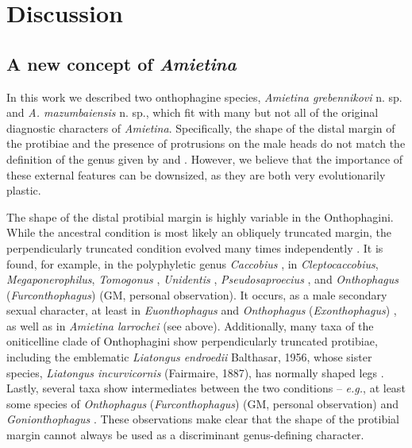\documentclass[fleqn,10pt,lineno]{wlpeerj}
\begin{document}
\section*{Discussion}

\subsection*{A new concept of \textit{Amietina}}
In this work we described two onthophagine species, \textit{Amietina grebennikovi} n. sp. and \textit{A. mazumbaiensis} n. sp., which fit with many but not all of the original diagnostic characters of \textit{Amietina}. Specifically, the shape of the distal margin of the protibiae and the presence of protrusions on the male heads do not match the definition of the genus given by \cite{cambefort1981amietina} and \cite{branco1988deux}. However, we believe that the importance of these external features can be downsized, as they are both very evolutionarily plastic.

The shape of the distal protibial margin is highly variable in the Onthophagini. While the ancestral condition is most likely an obliquely truncated margin, the perpendicularly truncated condition evolved many times independently \citep{ayivi2021mitochondrial, breeschoten2016phylogenetics, tarasov2011phylogenetic, philips2016phylogeny}. It is found, for example, in the polyphyletic genus \textit{Caccobius} \citep{tarasov2011phylogenetic, genier2017digitonthophagus}, in \textit{Cleptocaccobius}, \textit{Megaponerophilus}, \textit{Tomogonus} \citep{davis2008african}, \textit{Unidentis} \citep{josso2008unidentis}, \textit{Pseudosaproecius} \citep{branco1995essai}, and \textit{Onthophagus} (\textit{Furconthophagus}) (GM, personal observation). It occurs, as a male secondary sexual character, at least in \textit{Euonthophagus} and \textit{Onthophagus} (\textit{Exonthophagus}) \citep{kabakov2006scarab}, as well as in \textit{Amietina larrochei} (see above). Additionally, many taxa of the oniticelline clade of Onthophagini \citep{breeschoten2016phylogenetics} show perpendicularly truncated protibiae, including the emblematic \textit{Liatongus endroedii} Balthasar, 1956, whose sister species, \textit{Liatongus incurvicornis} (Fairmaire, 1887), has normally shaped legs \citep{balthasar1956einige}. Lastly, several taxa show intermediates between the two conditions -- \textit{e.g.}, at least some species of \textit{Onthophagus} (\textit{Furconthophagus}) (GM, personal observation) and \textit{Gonionthophagus} \citep{dierkens2023gonionthophagus}. These observations make clear that the shape of the protibial margin cannot always be used as a discriminant genus-defining character.
\end{document}

